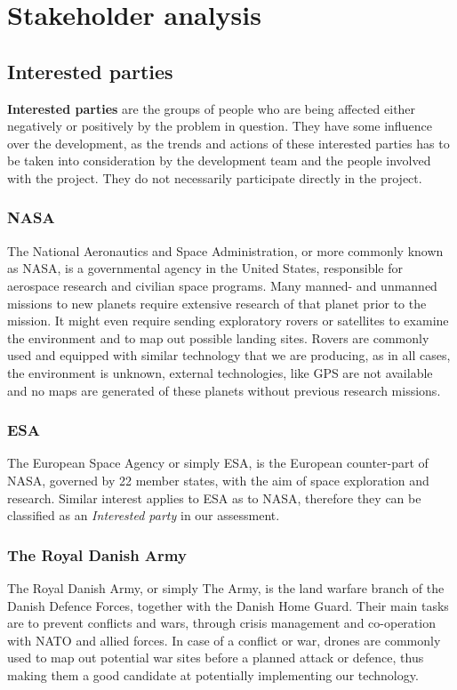 \clearpage
\section{Stakeholder analysis}
	
\subsection{Interested parties}
\textbf{Interested parties} are the groups of people who are being affected either negatively or positively by the problem in question. They have some influence over the development, as the trends and actions of these interested parties has to be taken into consideration by the development team and the people involved with the project. They do not necessarily participate directly in the project.

\subsubsection{NASA}
The National Aeronautics and Space Administration, or more commonly known as NASA, is a governmental agency in the United States, responsible for aerospace research and civilian space programs. Many manned- and unmanned missions to new planets require extensive research of that planet prior to the mission. It might even require sending exploratory rovers or satellites to examine the environment and to map out possible landing sites. Rovers are commonly used and equipped with similar technology that we are producing, as in all cases, the environment is unknown, external technologies, like GPS are not available and no maps are generated of these planets without previous research missions. 

\subsubsection{ESA}
The European Space Agency or simply ESA, is the European counter-part of NASA, governed by 22 member states, with the aim of space exploration and research. Similar interest applies to ESA as to NASA, therefore they can be classified as an \textit{Interested party} in our assessment.

\subsubsection{The Royal Danish Army}
The Royal Danish Army, or simply The Army, is the land warfare branch of the Danish Defence Forces, together with the Danish Home Guard. Their main tasks are to prevent conflicts and wars, through crisis management and co-operation with NATO and allied forces\cite{armytasks}. In case of a conflict or war, drones are commonly used to map out potential war sites before a planned attack or defence, thus making them a good candidate at potentially implementing our technology.

